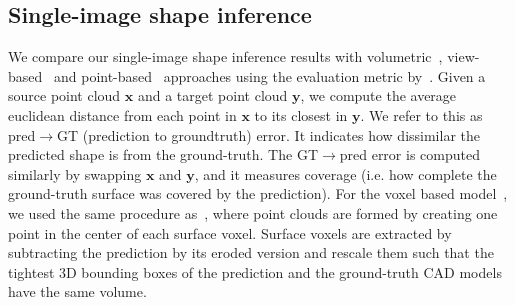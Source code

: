\subsection{Single-image shape inference} \label{sec:exp_shapeinfer} We compare our single-image shape inference results with volumetric~\cite{choy20163d}, view-based~\cite{lin2018learning} and point-based~\cite{fan2016point} approaches using the evaluation metric by~\cite{lin2018learning}. 
Given a source point cloud $\mathbf{x}$ and a target point cloud $\mathbf{y}$, we compute
the average euclidean distance from each point in $\mathbf{x}$ to its closest in $\mathbf{y}$.
We refer to this as pred$\to$GT (prediction to groundtruth) error. It indicates how dissimilar the predicted shape is from the ground-truth.
The GT$\to$pred error is computed similarly by swapping $\mathbf{x}$ and $\mathbf{y}$, and it measures coverage (i.e. how complete the ground-truth surface was covered by the prediction).
For the voxel based model~\cite{choy20163d}, we used the same procedure as~\cite{lin2018learning},
where point clouds are formed by creating one point in the center of each surface voxel.
Surface voxels are extracted by subtracting the prediction by
its eroded version and rescale them such that the tightest 3D bounding boxes of the prediction and
the ground-truth CAD models have the same volume.

